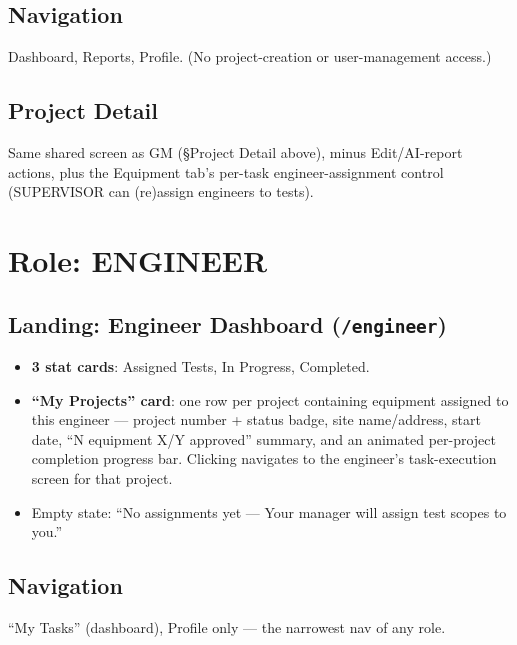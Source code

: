 \documentclass[11pt]{article}
\begin{document}
\subsection{Navigation}
Dashboard, Reports, Profile. (No project-creation or user-management access.)

\subsection{Project Detail}
Same shared screen as GM (\S{}Project Detail above), minus Edit/AI-report actions, plus the
Equipment tab's per-task engineer-assignment control (SUPERVISOR can (re)assign engineers to
tests).

\section{Role: ENGINEER}
\label{sec:engineer-detail}

\subsection{Landing: Engineer Dashboard (\texttt{/engineer})}
\begin{itemize}[nosep]
  \item \textbf{3 stat cards}: Assigned Tests, In Progress, Completed.
  \item \textbf{``My Projects'' card}: one row per project containing equipment assigned to this
    engineer --- project number + status badge, site name/address, start date, ``N equipment
    \textperiodcentered{} X/Y approved'' summary, and an animated per-project completion progress
    bar. Clicking navigates to the engineer's task-execution screen for that project.
  \item Empty state: ``No assignments yet --- Your manager will assign test scopes to you.''
\end{itemize}

\subsection{Navigation}
``My Tasks'' (dashboard), Profile only --- the narrowest nav of any role.
\end{document}

